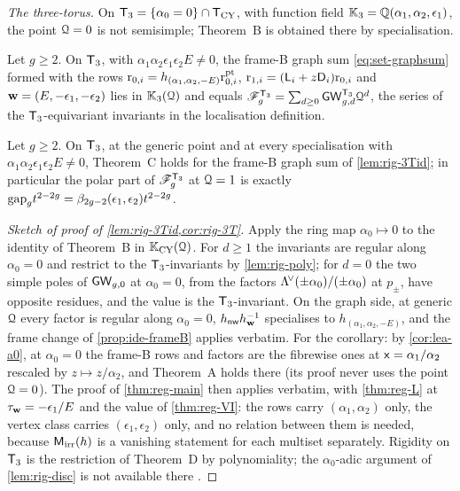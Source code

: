 \emph{The three-torus.} On $\mathsf{T}_{3}=\{\alpha_0=0\}\cap\mathsf{T}_{\mathrm{CY}}$, with function field $\mathbb{K}_{3}=\mathbb{Q}(\alpha_1,\alpha_2,\epsilon_1)$, the point $\mathcal{Q}=0$ is not semisimple; Theorem~B is obtained there by specialisation.

\begin{lem}
\label{lem:rig-3Tid}
Let $g\geq 2$. On $\mathsf{T}_{3}$, with $\alpha_1\alpha_2\epsilon_1\epsilon_2E\neq 0$, the frame-B graph sum \eqref{eq:set-graphsum} formed with the rows $\mathrm{r}_{0,i}=h_{(\alpha_1,\alpha_2,-E)}\mathrm{r}^{\mathrm{pt}}_{0,i}$, $\mathrm{r}_{1,i}=(\mathsf{L}_i+z\mathsf{D}_i)\mathrm{r}_{0,i}$ and $\mathbf{w}=(E,-\epsilon_1,-\epsilon_2)$ lies in $\mathbb{K}_{3}(\mathcal{Q})$ and equals $\mathscr{F}^{\mathsf{T}_{3}}_g=\sum_{d\geq 0}\mathsf{GW}^{\mathsf{T}_{3}}_{g,d}\mathcal{Q}^d$, the series of the $\mathsf{T}_{3}$-equivariant invariants in the localisation definition.
\end{lem}

\begin{cor}
\label{cor:rig-3T}
Let $g\geq 2$. On $\mathsf{T}_{3}$, at the generic point and at every specialisation with $\alpha_1\alpha_2\epsilon_1\epsilon_2E\neq 0$, Theorem~C holds for the frame-B graph sum of \cref{lem:rig-3Tid}; in particular the polar part of $\mathscr{F}^{\mathsf{T}_{3}}_g$ at $\mathcal{Q}=1$ is exactly $\mathrm{gap}_g t^{2-2g}=\beta_{2g-2}(\epsilon_1,\epsilon_2)t^{2-2g}$.
\end{cor}

\begin{proof}[Sketch of proof of \cref{lem:rig-3Tid,cor:rig-3T}]
Apply the ring map $\alpha_0\mapsto0$ to the identity of Theorem~B in $\mathbb{K}_{\mathrm{CY}}(\mathcal{Q})$. For $d\geq1$ the invariants are regular along $\alpha_0=0$ and restrict to the $\mathsf{T}_{3}$-invariants by \cref{lem:rig-poly}; for $d=0$ the two simple poles of $\mathsf{GW}_{g,0}$ at $\alpha_0=0$, from the factors $\Lambda^{\!\vee}(\pm\alpha_0)/(\pm\alpha_0)$ at $p_\pm$, have opposite residues, and the value is the $\mathsf{T}_{3}$-invariant. On the graph side, at generic $\mathcal{Q}$ every factor is regular along $\alpha_0=0$, $h_{\mathsf{nw}}h_{\mathbf{w}}^{-1}$ specialises to $h_{(\alpha_1,\alpha_2,-E)}$, and the frame change of \cref{prop:ide-frameB} applies verbatim. For the corollary: by \cref{cor:lea-a0}, at $\alpha_0=0$ the frame-B rows and factors are the fibrewise ones at $\mathsf{x}=\alpha_1/\alpha_2$ rescaled by $z\mapsto z/\alpha_2$, and Theorem~A holds there (its proof never uses the point $\mathcal{Q}=0$). The proof of \cref{thm:reg-main} then applies verbatim, with \cref{thm:reg-L} at $\tau_{\mathbf{w}}=-\epsilon_1/E$ and the value of \cref{thm:reg-VI}: the rows carry $(\alpha_1,\alpha_2)$ only, the vertex class carries $(\epsilon_1,\epsilon_2)$ only, and no relation between them is needed, because $\mathsf{M}_{\mathrm{irr}}(h)$ is a vanishing statement for each multiset separately. Rigidity on $\mathsf{T}_{3}$ is the restriction of Theorem~D by polynomiality; the $\alpha_0$-adic argument of \cref{lem:rig-disc} is not available there .
\end{proof}
